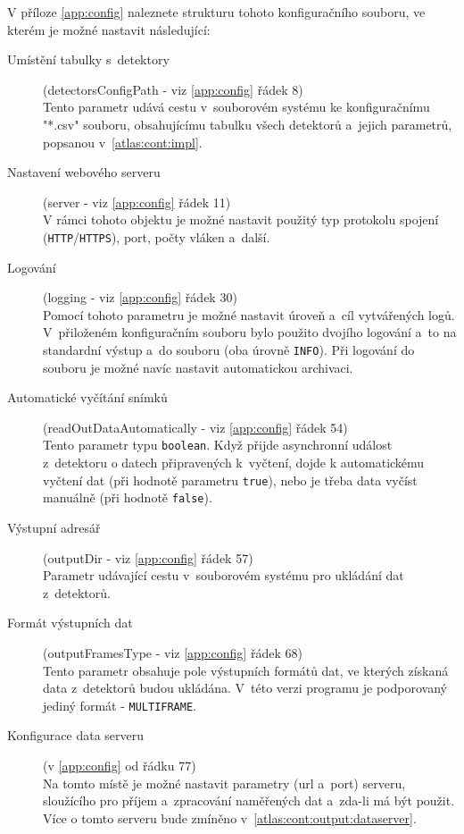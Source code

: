 V příloze \ref{app:config} naleznete strukturu tohoto konfiguračního souboru, ve kterém je možné nastavit následující:
\begin{description}
	\item[Umístění tabulky s~detektory] (detectorsConfigPath - viz \ref{app:config} řádek 8)\\
		Tento parametr udává cestu v~souborovém systému ke konfiguračnímu "*.csv" souboru, obsahujícímu tabulku všech detektorů a~jejich parametrů, popsanou v~\ref{atlas:cont:impl}.
	\item[Nastavení webového serveru] (server - viz \ref{app:config} řádek 11)\\
		V rámci tohoto objektu je možné nastavit použitý typ protokolu spojení (\texttt{HTTP}/\texttt{HTTPS}), port, počty vláken a~další.
	\item[Logování] (logging - viz \ref{app:config} řádek 30)\\
		Pomocí tohoto parametru je možné nastavit úroveň a~cíl vytvářených logů. V~přiloženém konfiguračním souboru bylo použito dvojího logování a~to na standardní výstup a~do souboru (oba úrovně \texttt{INFO}). Při logování do souboru je možné navíc nastavit automatickou archivaci.
	\item[Automatické vyčítání snímků] (readOutDataAutomatically - viz \ref{app:config} řádek 54)\\
		Tento parametr typu \texttt{boolean}. Když přijde asynchronní událost z~detektoru o datech připravených k~vyčtení, dojde k automatickému vyčtení dat (při hodnotě parametru \texttt{true}), nebo je třeba data vyčíst manuálně (při hodnotě \texttt{false}).
	\item[Výstupní adresář] (outputDir - viz \ref{app:config} řádek 57)\\
		Parametr udávající cestu v~souborovém systému pro ukládání dat z~detektorů.
	\item[Formát výstupních dat] (outputFramesType - viz \ref{app:config} řádek 68)\\
		Tento parametr obsahuje pole výstupních formátů dat, ve kterých získaná data z~detektorů budou ukládána. V~této verzi programu je podporovaný jediný formát - \texttt{MULTIFRAME}.
	\item[Konfigurace data serveru] (v \ref{app:config} od řádku 77)\\
		Na tomto místě je možné nastavit parametry (url a~port) serveru, sloužícího pro příjem a~zpracování naměřených dat a~zda-li má být použit. Více o tomto serveru bude zmíněno v~\ref{atlas:cont:output:dataserver}.
\end{description}

